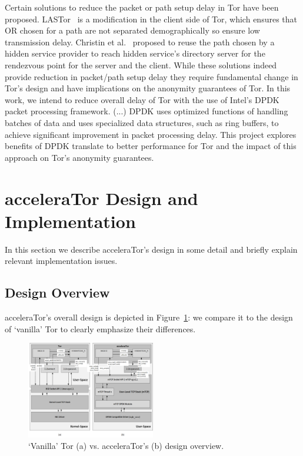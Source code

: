 \documentclass[conference]{IEEEtran}
\begin{document}
Certain solutions to reduce the packet or path setup delay in Tor have been proposed. LASTor~\cite{6679287} is a modification in the client side of Tor, which ensures that OR chosen for a path are not separated demographically so ensure low transmission delay. Christin et al.~\cite{Christin2013} proposed to reuse the path chosen by a hidden service provider to reach hidden service's directory server for the rendezvous point for the server and the client. While these solutions indeed provide reduction in packet/path setup delay they require fundamental change in Tor's design and have  implications on the anonymity guarantees of Tor. In this work, we intend to reduce overall delay of Tor with the use of Intel's DPDK packet processing framework. (...) DPDK uses optimized functions of handling batches of data and uses specialized data structures, such as ring buffers, to achieve significant improvement in packet processing delay. This project explores benefits of DPDK translate to better performance for Tor and the impact of this approach on Tor's anonymity guarantees. 

\section{acceleraTor Design and Implementation}
\label{sec:design}

In this section we describe acceleraTor's design in some detail and briefly 
explain relevant implementation issues.

\subsection{Design Overview}
\label{subsec:design-overview}

acceleraTor's overall design is depicted in Figure~\ref{fig:accelerator-design}: we 
compare it to the design of `vanilla' Tor to clearly emphasize their differences.

\begin{figure}[h!]

    \centering
    \includegraphics[width=0.50\textwidth]{figures/design.png}
    \cprotect\caption{`Vanilla' Tor (a) vs. acceleraTor's (b) design overview.}
    \label{fig:accelerator-design}

\end{figure}
\end{document}

